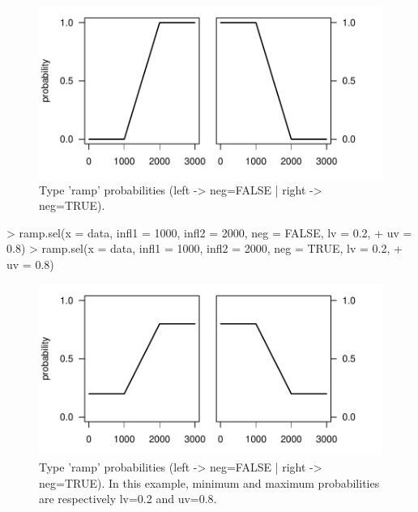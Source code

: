 \documentclass[letterpaper, 12pt]{article}
\begin{document}
\begin{figure}[h]
\vspace{-20pt}
\begin{center}
\includegraphics{relation_sel-015}
\end{center}
\vspace{-30pt}
\caption{Type 'ramp' probabilities (left -> neg=FALSE |  right -> neg=TRUE).}
\vspace{-10pt}
\label{fig7}
\end{figure}

\vspace*{\fill}
\newpage


\begin{Schunk}
\begin{Sinput}
> ramp.sel(x = data, infl1 = 1000, infl2 = 2000, neg = FALSE, lv = 0.2, 
+     uv = 0.8)
> ramp.sel(x = data, infl1 = 1000, infl2 = 2000, neg = TRUE, lv = 0.2, 
+     uv = 0.8)
\end{Sinput}
\end{Schunk}

\begin{figure}[h]
\vspace{-20pt}
\begin{center}
\includegraphics{relation_sel-017}
\end{center}
\vspace{-30pt}
\caption{Type 'ramp' probabilities (left -> neg=FALSE |  right -> neg=TRUE). In this example, minimum and maximum probabilities are respectively lv=0.2 and uv=0.8.}
\vspace{-10pt}
\label{fig8}
\end{figure}
\end{document}
